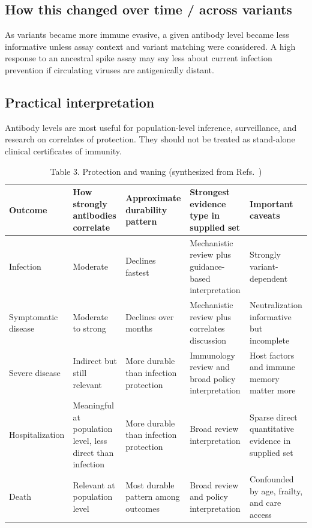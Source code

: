 \documentclass[12pt]{article}
\begin{document}
\subsection*{How this changed over time / across variants}
As variants became more immune evasive, a given antibody level became less informative unless assay context and variant matching were considered. A high response to an ancestral spike assay may say less about current infection prevention if circulating viruses are antigenically distant.

\subsection*{Practical interpretation}
Antibody levels are most useful for population-level inference, surveillance, and research on correlates of protection. They should not be treated as stand-alone clinical certificates of immunity.

\begin{table}[H]
\centering
\caption{Table 3. Protection and waning (synthesized from Refs.~\cite{ref1,ref3,ref5,ref8})}
\begin{tabularx}{\textwidth}{>{\raggedright\arraybackslash}p{2.0cm} >{\raggedright\arraybackslash}p{2.6cm} >{\raggedright\arraybackslash}p{2.6cm} >{\raggedright\arraybackslash}p{2.5cm} >{\raggedright\arraybackslash}X}
\toprule
Outcome & How strongly antibodies correlate & Approximate durability pattern & Strongest evidence type in supplied set & Important caveats \\
\midrule
Infection & Moderate & Declines fastest & Mechanistic review plus guidance-based interpretation & Strongly variant-dependent \\
Symptomatic disease & Moderate to strong & Declines over months & Mechanistic review plus correlates discussion & Neutralization informative but incomplete \\
Severe disease & Indirect but still relevant & More durable than infection protection & Immunology review and broad policy interpretation & Host factors and immune memory matter more \\
Hospitalization & Meaningful at population level, less direct than infection & More durable than infection protection & Broad review interpretation & Sparse direct quantitative evidence in supplied set \\
Death & Relevant at population level & Most durable pattern among outcomes & Broad review and policy interpretation & Confounded by age, frailty, and care access \\
\bottomrule
\end{tabularx}
\end{table}
\end{document}
